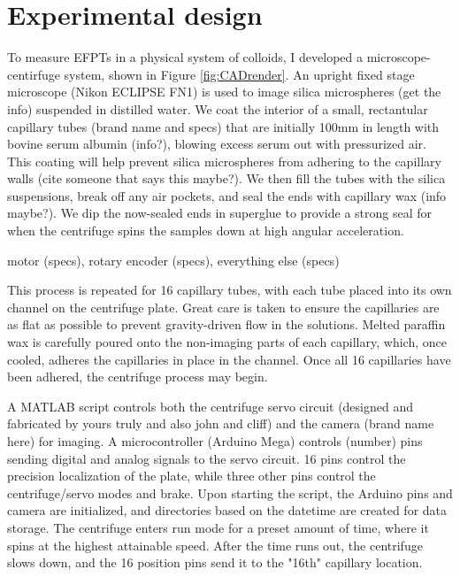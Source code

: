 
\section{Experimental design}

To measure EFPTs in a physical system of colloids, I developed a microscope-centirfuge system, shown in Figure \ref{fig:CADrender}. An upright fixed stage microscope (Nikon ECLIPSE FN1) is used to image silica microspheres (get the info) suspended in distilled water. We coat the interior of a small, rectantular capillary tubes (brand name and specs) that are initially 100mm in length with bovine serum albumin (info?), blowing excess serum out with pressurized air. This coating will help prevent silica microspheres from adhering to the capillary walls (cite someone that says this maybe?). We then fill the tubes with the silica suspensions, break off any air pockets, and seal the ends with capillary wax (info maybe?). We dip the now-sealed ends in superglue to provide a strong seal for when the centrifuge spins the samples down at high angular acceleration.

 motor (specs), rotary encoder (specs), everything else (specs)

This process is repeated for 16 capillary tubes, with each tube placed into its own channel on the centrifuge plate. Great care is taken to ensure the capillaries are as flat as possible to prevent gravity-driven flow in the solutions. Melted paraffin wax is carefully poured onto the non-imaging parts of each capillary, which, once cooled, adheres the capillaries in place in the channel. Once all 16 capillaries have been adhered, the centrifuge process may begin.

A MATLAB script controls both the centrifuge servo circuit (designed and fabricated by yours truly and also john and cliff) and the camera (brand name here) for imaging. A microcontroller (Arduino Mega) controls (number) pins sending digital and analog signals to the servo circuit. 16 pins control the precision localization of the plate, while three other pins control the centrifuge/servo modes and brake. Upon starting the script, the Arduino pins and camera are initialized, and directories based on the datetime are created for data storage. The centrifuge enters run mode for a preset amount of time, where it spins at the highest attainable speed. After the time runs out, the centrifuge slows down, and the 16 position pins send it to the "16th" capillary location.

